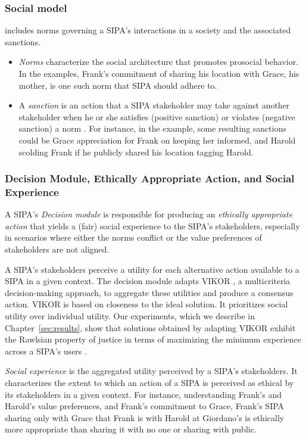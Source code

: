 \subsubsection{Social model} includes norms governing a SIPA's interactions in a society and the associated sanctions. 
\begin{itemize}
\item \emph{Norms} characterize the social architecture that promotes prosocial behavior. In the \locationapp examples, Frank's commitment of sharing his location with Grace, his mother, is one such norm that \locationapp SIPA should adhere to. 
\item A \emph{sanction} is an action that a SIPA stakeholder may take against another stakeholder when he or she satisfies (positive sanction) or violates (negative sanction) a norm \citep{Nardin-KER16-Classifying}. For instance, in the \locationapp example, some resulting sanctions could be Grace appreciation for Frank on keeping her informed, and Harold scolding Frank if he publicly shared his location tagging Harold. 
\end{itemize}

\subsubsection{Decision Module, Ethically Appropriate Action, and Social Experience}

A SIPA's \emph{Decision module} is responsible for producing an \emph{ethically appropriate action} that yields a (fair) social experience to the SIPA's stakeholders, 
especially in scenarios where either the norms conflict or the value preferences 
of stakeholders are not aligned. 

A SIPA's stakeholders perceive a utility for each alternative action available to a SIPA in a given context. The decision module adapts VIKOR \citep{opricovic2004compromise}, a multicriteria decision-making approach, to aggregate these utilities and produce a consensus action. VIKOR is based on closeness to the ideal solution. It prioritizes social utility over individual utility. Our experiments, which we describe in Chapter~\ref{sec:results}, show that solutions obtained by \frameworkAinur adapting VIKOR exhibit the Rawlsian property of justice in terms of maximizing the minimum experience across a SIPA's users \citep{rawls1985justice, Leben2017Rawls}. 

\emph{Social experience} is the aggregated utility perceived by a SIPA's stakeholders. It characterizes the extent to which an action of a SIPA is perceived as ethical by its stakeholders in a given context. For instance, understanding Frank's and Harold's value preferences, and Frank's commitment to Grace, Frank's \locationapp SIPA sharing only with Grace that Frank is with Harold at Giordano's is ethically more appropriate than sharing it with no one or sharing with public. 



